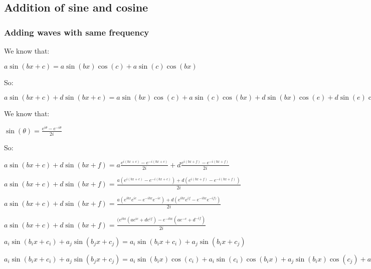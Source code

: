 
\subsection{Addition of sine and cosine}

\subsubsection{Adding waves with same frequency}

We know that:

\(a\sin(bx+c)=a\sin(bx)\cos(c)+a\sin(c)\cos(bx)\)

So:

\(a\sin(bx+c)+d\sin(bx+e)=a\sin(bx)\cos(c)+a\sin(c)\cos(bx)+ d\sin(bx)\cos(e)+d\sin(e)\cos(bx)\)

We know that:

\(\sin(\theta )=\frac{e^{i\theta }-e^{-i\theta }}{2i}\)

So:

\(a\sin(bx+c)+d\sin(bx+f)=a\frac{e^{i(bx+c)}-e^{-i(bx+c)}}{2i}+d\frac{e^{i(bx+f)}-e^{-i(bx+f)}}{2i}\)

\(a\sin(bx+c)+d\sin(bx+f)=\frac{a(e^{i(bx+c)}-e^{-i(bx+c)})+d(e^{i(bx+f)}-e^{-i(bx+f)})}{2i}\)

\(a\sin(bx+c)+d\sin(bx+f)=\frac{a(e^{ibx}e^{ic}-e^{-ibx}e^{-ic})+d(e^{ibx}e^{if}-e^{-ibx}e^{-if)})}{2i}\)

\(a\sin(bx+c)+d\sin(bx+f)=\frac{(e^{ibx}(ae^{ic}+de^{if})-e^{-ibx}(ae^{-c}+d^{-if})}{2i}\)

\(a_i\sin(b_ix+c_i)+a_j\sin(b_jx+c_j)=a_i\sin(b_ix+c_i)+a_j\sin(b_ix+c_j)\)

\(a_i\sin(b_ix+c_i)+a_j\sin(b_jx+c_j)=a_i\sin(b_ix)\cos(c_i)+a_i\sin(c_i)\cos(b_ix)+a_j\sin(b_ix)\cos(c_j)+a_j\sin(c_j)\cos(b_ix)\)

